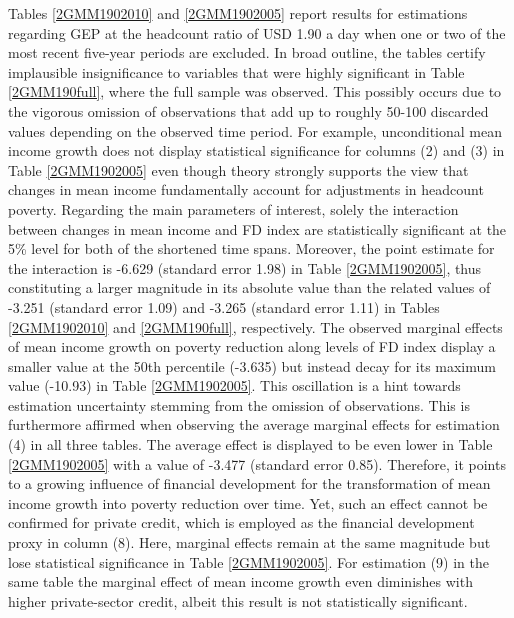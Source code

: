\documentclass[12pt, a4paper]{article}
\begin{document}
Tables \ref{2GMM1902010} and \ref{2GMM1902005} report results for estimations regarding GEP at the headcount ratio of USD 1.90 a day when one or two of the most recent five-year periods are excluded. In broad outline, the tables certify implausible insignificance to variables that were highly significant in Table \ref{2GMM190full}, where the full sample was observed. This possibly occurs due to the vigorous omission of observations that add up to roughly 50-100 discarded values depending on the observed time period. For example, unconditional mean income growth does not display statistical significance for columns (2) and (3) in Table \ref{2GMM1902005} even though theory strongly supports the view that changes in mean income fundamentally account for adjustments in headcount poverty. Regarding the main parameters of interest, solely the interaction between changes in mean income and FD index are statistically significant at the 5\% level for both of the shortened time spans. Moreover, the point estimate for the interaction is -6.629 (standard error 1.98) in Table \ref{2GMM1902005}, thus constituting a larger magnitude in its absolute value than the related values of -3.251 (standard error 1.09) and -3.265 (standard error 1.11) in Tables \ref{2GMM1902010} and \ref{2GMM190full}, respectively. The observed marginal effects of mean income growth on poverty reduction along levels of FD index display a smaller value at the 50th percentile (-3.635) but instead decay for its maximum value (-10.93) in Table \ref{2GMM1902005}. This oscillation is a hint towards estimation uncertainty stemming from the omission of observations. This is furthermore affirmed when observing the average marginal effects for estimation (4) in all three tables. The average effect is displayed to be even lower in Table \ref{2GMM1902005} with a value of -3.477 (standard error 0.85). Therefore, it points to a growing influence of financial development for the transformation of mean income growth into poverty reduction over time. Yet, such an effect cannot be confirmed for private credit, which is employed as the financial development proxy in column (8). Here, marginal effects remain at the same magnitude but lose statistical significance in Table \ref{2GMM1902005}. For estimation (9) in the same table the marginal effect of mean income growth even diminishes with higher private-sector credit, albeit this result is not statistically significant.
\end{document}
